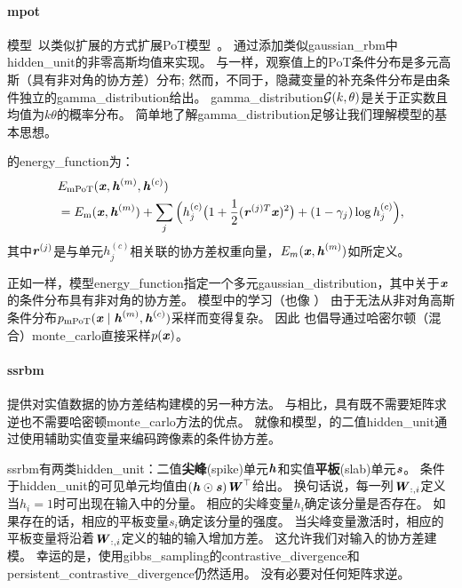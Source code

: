  
\paragraph{\gls{mpot}}
模型~\citep{ranzato+mnih+hinton:2010-short}以类似扩展的方式扩展PoT模型~\citep{Welling2003a-small}。
通过添加类似\gls{gaussian_rbm}中\gls{hidden_unit}的非零高斯均值来实现。
与一样，观察值上的PoT条件分布是多元高斯（具有非对角的协方差）分布; 然而，不同于，隐藏变量的补充条件分布是由条件独立的\gls{gamma_distribution}给出。
\gls{gamma_distribution}$\mathcal{G}(k, \theta)$是关于正实数且均值为$k\theta$的概率分布。
简单地了解\gls{gamma_distribution}足够让我们理解模型的基本思想。

的\gls{energy_function}为：
\begin{align}
 &E_{\text{mPoT}}(\boldsymbol{\mathit{x}}, \boldsymbol{\mathit{h}}^{(m)}, \boldsymbol{\mathit{h}}^{(c)}) \\
 &= E_{\text{m}}(\boldsymbol{\mathit{x}}, \boldsymbol{\mathit{h}}^{(m)}) + \sum_j \Big( h_j^{(c)} \big( 1+\frac{1}{2}(\boldsymbol{\mathit{r}}^{(j)T}\boldsymbol{\mathit{x}})^2  \big)
 +(1-\gamma_j)\log h_j^{(c)} \Big),
\end{align}
其中$\boldsymbol{\mathit{r}}^{(j)}$是与单元$h_j^{(c)}$相关联的协方差权重向量，$E_m(\boldsymbol{\mathit{x}}, \boldsymbol{\mathit{h}}^{(m)})$如所定义。

正如一样，模型\gls{energy_function}指定一个多元\gls{gaussian_distribution}，其中关于$\boldsymbol{\mathit{x}}$的条件分布具有非对角的协方差。
模型中的学习（也像 ） 由于无法从非对角高斯条件分布$p_{\text{mPoT}}(\boldsymbol{\mathit{x}}  \mid  \boldsymbol{\mathit{h}}^{(m)}, \boldsymbol{\mathit{h}}^{(c)}) $采样而变得复杂。
因此\citet{ranzato+mnih+hinton:2010-short} 也倡导通过哈密尔顿（混合）\gls{monte_carlo}直接采样$p(\boldsymbol{\mathit{x}})$。


\paragraph{\gls{ssrbm}} \citep{Courville+al-2011}提供对实值数据的协方差结构建模的另一种方法。
与相比，具有既不需要矩阵求逆也不需要哈密顿\gls{monte_carlo}方法的优点。
就像和模型，的二值\gls{hidden_unit}通过使用辅助实值变量来编码跨像素的条件协方差。


\gls{ssrbm}有两类\gls{hidden_unit}：二值\textbf{尖峰}(spike)单元$\boldsymbol{\mathit{h}}$和实值\textbf{平板}(slab)单元$\boldsymbol{\mathit{s}}$。
条件于\gls{hidden_unit}的可见单元均值由$(\boldsymbol{\mathit{h}} \odot \boldsymbol{\mathit{s}})\boldsymbol{\mathit{W}}^\top$给出。
换句话说，每一列$\boldsymbol{\mathit{W}}_{:,i}$定义当$h_i=1$时可出现在输入中的分量。
相应的尖峰变量$h_i$确定该分量是否存在。
如果存在的话，相应的平板变量$s_i$确定该分量的强度。
当尖峰变量激活时，相应的平板变量将沿着$\boldsymbol{\mathit{W}}_{:,i}$定义的轴的输入增加方差。
这允许我们对输入的协方差建模。
幸运的是，使用\gls{gibbs_sampling}的\gls{contrastive_divergence}和\gls{persistent_contrastive_divergence}仍然适用。
没有必要对任何矩阵求逆。

